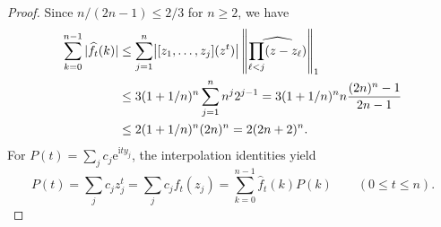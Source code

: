 \documentclass[11pt]{article}
\newcommand{\ii}{\mathrm i}
\begin{document}
\begin{proof}
Since $n/(2n-1)\le2/3$ for $n\ge2$, we have
\begin{align}
\sum_{k=0}^{n-1}|\widehat f_t(k)|&\le\sum_{j=1}^n\bigl|[z_1,\ldots,z_j](z^t)\bigr|\left\|\widehat{\prod_{\ell<j}(z-z_\ell)}\right\|_1\notag\\
&\le3(1+1/n)^n\sum_{j=1}^n n^j2^{j-1}=3(1+1/n)^n n\frac{(2n)^n-1}{2n-1}\notag\\
&\le2(1+1/n)^n(2n)^n=2(2n+2)^n.\label{eq:interpolation-coefficients}
\end{align}
For $P(t)=\sum_jc_j\mathrm e^{\ii ty_j}$, the interpolation identities yield
\begin{equation}\label{eq:local-interpolation}
P(t)=\sum_jc_jz_j^t=\sum_jc_jf_t(z_j)=\sum_{k=0}^{n-1}\widehat f_t(k)P(k)\qquad(0\le t\le n).
\end{equation}


\end{proof}
\end{document}
